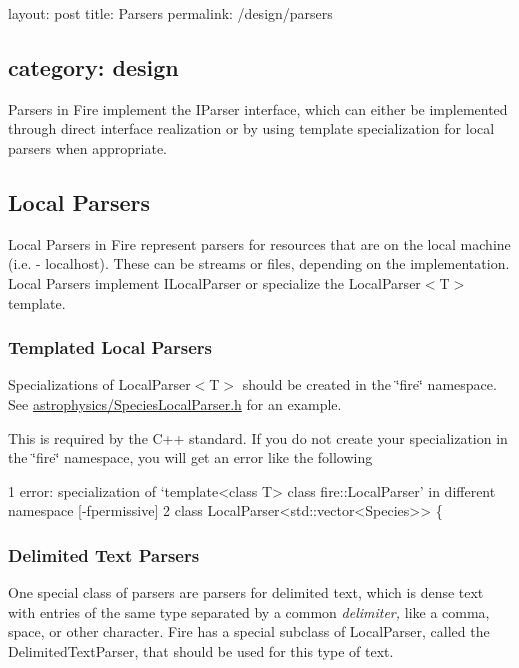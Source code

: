 

 layout\+: post title\+: Parsers permalink\+: /design/parsers \subsection*{category\+: design }

Parsers in Fire implement the I\+Parser interface, which can either be implemented through direct interface realization or by using template specialization for local parsers when appropriate.

\subsection*{Local Parsers}

Local Parsers in Fire represent parsers for resources that are on the local machine (i.\+e. -\/ localhost). These can be streams or files, depending on the implementation. Local Parsers implement I\+Local\+Parser or specialize the Local\+Parser$<$T$>$ template.

\subsubsection*{Templated Local Parsers}

Specializations of Local\+Parser$<$T$>$ should be created in the \char`\"{}fire\char`\"{} namespace. See \hyperlink{a00741_source}{astrophysics/\+Species\+Local\+Parser.\+h} for an example.

This is required by the C++ standard. If you do not create your specialization in the \char`\"{}fire\char`\"{} namespace, you will get an error like the following


\begin{DoxyCode}
1 error: specialization of ‘template<class T> class fire::LocalParser’ in different namespace [-fpermissive]
2  class LocalParser<std::vector<Species>> \{
\end{DoxyCode}


\subsubsection*{Delimited Text Parsers}

One special class of parsers are parsers for delimited text, which is dense text with entries of the same type separated by a common {\itshape delimiter,} like a comma, space, or other character. Fire has a special subclass of Local\+Parser, called the Delimited\+Text\+Parser, that should be used for this type of text.

